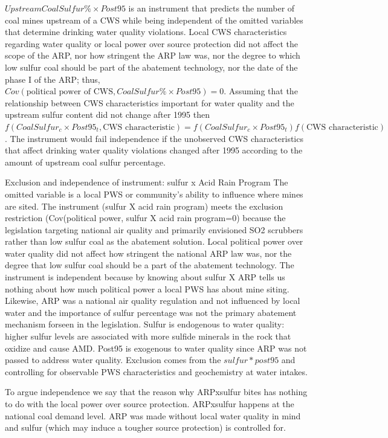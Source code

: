 \documentclass{article}
\begin{document}
$UpstreamCoalSulfur\%\times Post95$ is an instrument that predicts the number of coal mines upstream of a CWS while being independent of the omitted variables that determine drinking water quality violations. Local CWS characteristics regarding water quality or local power over source protection did not affect the scope of the ARP, nor how stringent the ARP law was, nor the degree to which low sulfur coal should be part of the abatement technology, nor the date of the phase I of the ARP; thus, $Cov(\text{political power of CWS}, Coal Sulfur \% \times Post95)=0$. Assuming that the relationship between CWS characteristics important for water quality and the upstream sulfur content did not change after 1995 then $f(CoalSulfur_c \times Post95_t, \text{CWS characteristic})=f(CoalSulfur_c \times Post95_t)f(\text{CWS characteristic})$. The instrument would fail independence if the unobserved CWS characteristics that affect drinking water quality violations changed after 1995 according to the amount of upstream coal sulfur percentage.

Exclusion and independence of instrument: sulfur x Acid Rain Program
The omitted variable is a local PWS or community's ability to influence where mines are sited. The instrument (sulfur X acid rain program) meets the exclusion restriction (Cov(political power, sulfur X acid rain program=0) because the legislation targeting national air quality and primarily envisioned SO2 scrubbers rather than low sulfur coal as the abatement solution. Local political power over water quality did not affect how stringent the national ARP law was, nor the degree that low sulfur coal should be a part of the abatement technology. The instrument is independent because by knowing about sulfur X ARP tells us nothing about how much political power a local PWS has about mine siting. Likewise, ARP was a national air quality regulation and not influenced by local water and the importance of sulfur percentage was not the primary abatement mechanism forseen in the legislation. Sulfur is endogenous to water quality: higher sulfur levels are associated with more sulfide minerals in the rock that oxidize and cause AMD. Post95 is exogenous to water quality since ARP was not passed to address water quality. Exclusion comes from the $sulfur*post95$ and controlling for observable PWS characteristics and geochemistry at water intakes.

To argue independence we say that the reason why ARPxsulfur bites has nothing to do with the local power over source protection. ARPxsulfur happens at the national coal demand level. ARP was made without local water quality in mind and sulfur (which may induce a tougher source protection) is controlled for.
\end{document}
